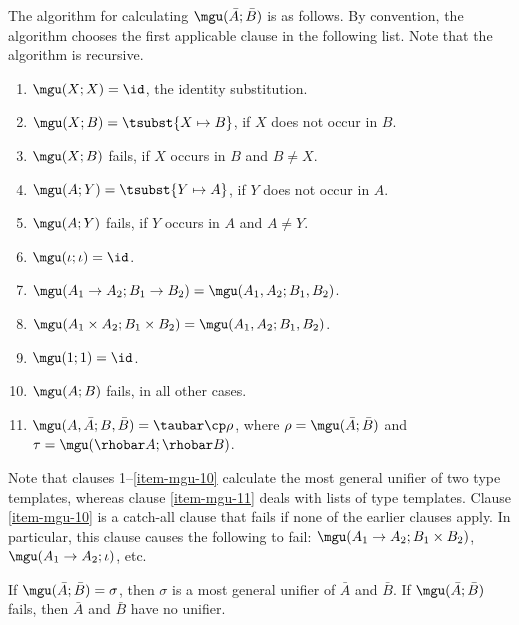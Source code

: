 \documentclass[12pt]{article}
\begin{document}
The algorithm for calculating $\mgu(\bar{A};\bar{B})$ is as follows.
By convention, the algorithm chooses the first applicable clause in the
following list. Note that the algorithm is recursive.

\begin{enumerate}
\item $\mgu(X;X)=\id$, the identity substitution.
\item\label{item-mgu-2} $\mgu(X;B)=\tsubst{X\mapsto B}$, if $X$ does
  not occur in $B$.
\item $\mgu(X;B)$ fails, if $X$ occurs in $B$ and $B\neq X$.
\item $\mgu(A;Y)=\tsubst{Y\mapsto A}$, if $Y$ does not occur in $A$.
\item $\mgu(A;Y)$ fails, if $Y$ occurs in $A$ and $A\neq Y$.
\item $\mgu(\iota;\iota)=\id$.
\item $\mgu(A_1\to A_2; B_1\to B_2) = \mgu(A_1,A_2; B_1,B_2)$.
\item $\mgu(A_1\times A_2; B_1\times B_2) = \mgu(A_1,A_2; B_1,B_2)$.
\item $\mgu(1; 1) = \id$.
\item\label{item-mgu-10} $\mgu(A; B)$ fails, in all other cases.
\item\label{item-mgu-11} $\mgu(A,\bar{A};B,\bar{B}) = \taubar \cp
  \rho$, where $\rho=\mgu(\bar{A};\bar{B})$ and $\tau=\mgu(\rhobar
  A;\rhobar B)$.
\end{enumerate}

Note that clauses 1--\ref{item-mgu-10} calculate the most general
unifier of two type templates, whereas clause {\ref{item-mgu-11}}
deals with lists of type templates. Clause {\ref{item-mgu-10}} is a
catch-all clause that fails if none of the earlier clauses apply.  In
particular, this clause causes the following to fail: $\mgu(A_1\to
A_2; B_1\times B_2)$, $\mgu(A_1\to A_2; \iota)$, etc.

\begin{proposition}\label{pro-unification}
  If $\mgu(\bar{A};\bar{B})=\sigma$, then $\sigma$ is a most general
  unifier of $\bar{A}$ and $\bar{B}$. If $\mgu(\bar{A};\bar{B})$
  fails, then $\bar{A}$ and $\bar{B}$ have no unifier. 
\end{proposition}
\end{document}
